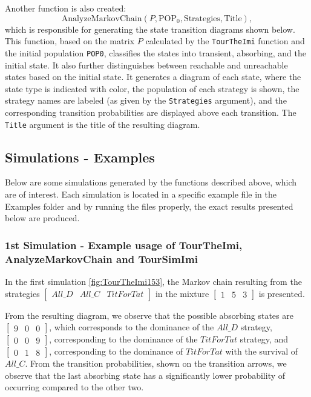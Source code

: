 Another function is also created:
\[
\text{AnalyzeMarkovChain}(P, \text{POP}_0, \text{Strategies}, \text{Title}),
\]
which is responsible for generating the state transition diagrams shown below. This function, based on the matrix \( P \) calculated by the \texttt{TourTheImi} function and the initial population \texttt{POP0}, classifies the states into transient, absorbing, and the initial state. It also further distinguishes between reachable and unreachable states based on the initial state. It generates a diagram of each state, where the state type is indicated with color, the population of each strategy is shown, the strategy names are labeled (as given by the \texttt{Strategies} argument), and the corresponding transition probabilities are displayed above each transition. The \texttt{Title} argument is the title of the resulting diagram.

\subsection{Simulations - Examples}
Below are some simulations generated by the functions described above, which are of interest. Each simulation is located in a specific example file in the Examples folder and by running the files properly, the exact results presented below are produced.
\subsubsection{1st Simulation - Example usage of Tour\-The\-Imi, Analyze\-Markov\-Chain and Tour\-Sim\-Imi}
In the first simulation \ref{fig:TourTheImi153}, the Markov chain resulting from the strategies $\begin{bmatrix}All\_D & All\_C & TitForTat\end{bmatrix}$ in the mixture $\begin{bmatrix}1 & 5 & 3\end{bmatrix}$ is presented.

From the resulting diagram, we observe that the possible absorbing states are $\begin{bmatrix}9 & 0 & 0\end{bmatrix}$, which corresponds to the dominance of the $All\_D$ strategy, $\begin{bmatrix}0 & 0 & 9\end{bmatrix}$, corresponding to the dominance of the $TitForTat$ strategy, and $\begin{bmatrix}0 & 1 & 8\end{bmatrix}$, corresponding to the dominance of $TitForTat$ with the survival of $All\_C$. From the transition probabilities, shown on the transition arrows, we observe that the last absorbing state has a significantly lower probability of occurring compared to the other two.

